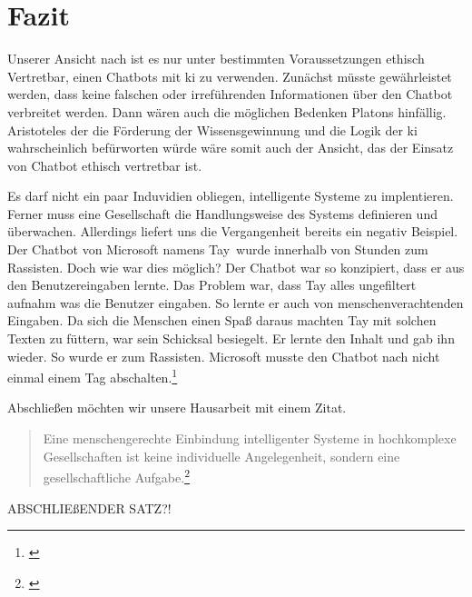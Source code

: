 \section{Fazit}
Unserer Ansicht nach ist es nur unter bestimmten Voraussetzungen ethisch Vertretbar, einen Chatbots mit \ac{ki} zu verwenden.
Zunächst müsste gewährleistet werden, dass keine falschen oder irreführenden Informationen über den Chatbot verbreitet werden. Dann wären auch die möglichen Bedenken Platons hinfällig. Aristoteles der die Förderung der Wissensgewinnung und die Logik der \ac{ki} wahrscheinlich befürworten würde wäre somit auch der Ansicht, das der Einsatz von Chatbot ethisch vertretbar ist.

Es darf nicht ein paar Induvidien obliegen, intelligente Systeme zu implentieren. Ferner muss eine Gesellschaft die Handlungsweise des Systems definieren und überwachen. Allerdings liefert uns die Vergangenheit bereits ein negativ Beispiel. \newline
Der Chatbot von Microsoft namens \glqq Tay\grqq\ wurde innerhalb von Stunden zum Rassisten. Doch wie war dies möglich? Der Chatbot war so konzipiert, dass er aus den Benutzereingaben lernte. Das Problem war, dass Tay alles ungefiltert aufnahm was die Benutzer eingaben. So lernte er auch von menschenverachtenden Eingaben. Da sich die Menschen einen Spaß daraus machten Tay mit solchen Texten zu \glqq füttern\grqq, war sein Schicksal besiegelt. Er lernte den Inhalt und gab ihn wieder. So wurde er zum Rassisten. Microsoft musste den Chatbot nach nicht einmal einem Tag abschalten.\footnote{\cite{TaySpiegel}} 

Abschließen möchten wir unsere Hausarbeit mit einem Zitat. 
\begin{quote}
	 \glqq Eine menschengerechte Einbindung intelligenter Systeme in hochkomplexe Gesellschaften ist keine individuelle Angelegenheit, sondern eine gesellschaftliche Aufgabe.\grqq\footnote{\cite{BitkomZitat}}
\end{quote}

ABSCHLIEßENDER SATZ?!


